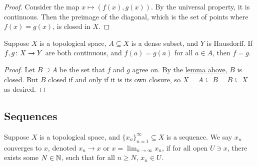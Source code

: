 \begin{proof}
    Consider the map \(x \mapsto (f(x),g(x))\).
    By the universal property, it is continuous.
    Then the preimage of the diagonal, which is the set of points where \(f(x) = g(x)\), is closed in \(X\).
\end{proof}
\begin{proposition}\label{prop:hausdorff-dense-agree}
    Suppose \(X\) is a topological space, \(A \subseteq X\) is a dense subset, and \(Y\) is Hausdorff.
    If \(f,g\colon X\to Y\) are both continuous, and \(f(a) = g(a)\) for all \(a \in A\),
    then \(f = g\).
\end{proposition}
\begin{proof}
    Let \(B \supseteq A\) be the set that \(f\) and \(g\) agree on.
    By the \hyperref[lem:cont-agree-closed]{lemma above}, \(B\) is closed.
    But \(B\) closed if and only if it is its own closure,
    so \(X = \overline{A} \subseteq \overline{B} = B \subseteq X\) as desired.
\end{proof}

\subsection*{Sequences}

\begin{definition}
    Suppose \(X\) is a topological space, and \({\{x_n\}}_{n=1}^\infty \subseteq X\) is a sequence.
    We say \(x_n\) converges to \(x\), denoted \(x_n \to x\) or \(x = \lim_{n\to\infty} x_n\),
    if for all open \(U \ni x\), there exists some \(N \in \mathbb{N}\),
    such that for all \(n \geq N\), \(x_n \in U\).
\end{definition}

